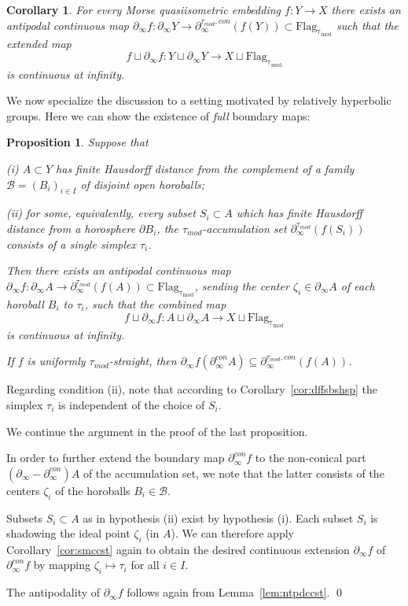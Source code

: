 \documentclass[12pt]{article}
\theoremstyle{boldplain}
\newtheorem{cor}[equation]{Corollary}
\newtheorem{prop}[equation]{Proposition}
\theoremstyle{bolddefinition}
\numberwithin{equation}{section}
\def\D{\partial}
\def\Flagt{\operatorname{Flag_{\tau_{mod}}}}
\def\geo{\partial_{\infty}}
\def\geoc{\partial_{\infty}^{con}}
\def\geot{\partial_{\infty}^{\tau_{mod}}}
\def\geotc{\partial_{\infty}^{\tau_{mod},con}}
\def\taumod{\tau_{mod}}
\begin{document}
\begin{cor}
\label{cor:mrsxtnd}
For every Morse quasiisometric embedding $f:Y\to X$ 
there exists an antipodal continuous map $\geo f:\geo Y\to\geotc(f(Y))\subset\Flagt$ such that the extended map 
$$ f\sqcup\geo f:Y\sqcup\geo Y \to X\sqcup\Flagt $$
is continuous at infinity.
\end{cor}

We now specialize the discussion to a setting motivated by relatively hyperbolic groups. 
Here we can show the existence of {\em full} boundary maps:
\begin{prop}
\label{prop:fllbdmpay}
Suppose that 

(i) $A\subset Y$ 
has finite Hausdorff distance from the complement of a family 
${\mathcal B}=(B_i)_{i\in I}$ of disjoint open horoballs;

(ii)
for some, equivalently, every subset $S_i\subset A$ which has finite Hausdorff distance from a horosphere $\D B_i$,
the $\taumod$-accumulation set $\geot(f(S_i))$ consists of a single simplex $\tau_i$.

Then there exists an antipodal continuous map $\geo f:\geo A\to\geot(f(A))\subset\Flagt$,
sending the center $\zeta_i\in\geo A$ of each horoball $B_i$ to $\tau_i$,
such that the combined map 
$$ f\sqcup\geo f:A\sqcup\geo A \to X\sqcup\Flagt $$
is continuous at infinity.

If $f$ is uniformly $\taumod$-straight, then $\geo f(\geoc A)\subseteq\geotc(f(A))$.
\end{prop}
Regarding condition (ii),
note that according to Corollary~\ref{cor:dffsbshsp} the simplex $\tau_i$ is independent of the choice of $S_i$.

\proof
We continue the argument in the proof of the last proposition. 

In order to further extend the boundary map $\geoc f$ to the non-conical part $(\geo -\geoc)A$ of the accumulation set,
we note that the latter consists of the centers $\zeta_i$ of the horoballs $B_i\in{\mathcal B}$.

Subsets $S_i\subset A$ as in hypothesis (ii) exist by hypothesis (i).
Each subset $S_i$ is shadowing the ideal point $\zeta_i$ (in $A$).
We can therefore apply Corollary~\ref{cor:smccst} again to obtain the desired continuous extension $\geo f$ of $\geoc f$
by mapping $\zeta_i\mapsto\tau_i$ for all $i\in I$.

The antipodality of $\geo f$ follows again from Lemma~\ref{lem:ntpdccst}.
\qed
\end{document}
